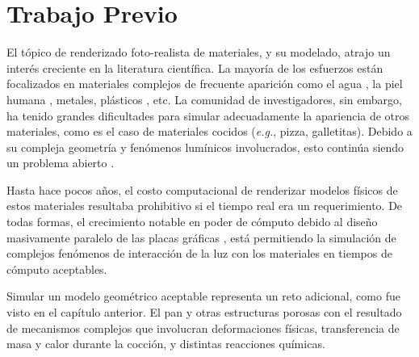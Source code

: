 




\section{Trabajo Previo}
El tópico de renderizado foto-realista de materiales, y su modelado, atrajo un interés creciente en la literatura científica.
La mayoría de los esfuerzos están focalizados en materiales complejos de frecuente aparición como el agua \cite{Schechter2012}, la piel humana \cite{Donner2006}, metales, plásticos \cite{Kurt2010}, etc.
La comunidad de investigadores, sin embargo, ha tenido grandes dificultades para simular adecuadamente la apariencia de otros materiales, como es el caso de materiales cocidos ({\em e.g.}, pizza, galletitas).
Debido a su compleja geometría y fenómenos lumínicos involucrados, esto continúa siendo un problema abierto \cite{Voglsam2013}.

Hasta hace pocos años, el costo computacional de renderizar modelos físicos de estos materiales resultaba prohibitivo si el tiempo real era un requerimiento.
De todas formas, el crecimiento notable en poder de cómputo debido al diseño masivamente paralelo de las placas gráficas \cite{Yeo09,Harris06}, está permitiendo la simulación de complejos fenómenos de interacción de la luz con los materiales en tiempos de cómputo aceptables.

Simular un modelo geométrico aceptable representa un reto adicional, como fue visto en el capítulo anterior.
El pan y otras estructuras porosas con el resultado de mecanismos complejos que involucran deformaciones físicas, transferencia de masa y calor durante la cocción, y distintas reacciones químicas.

